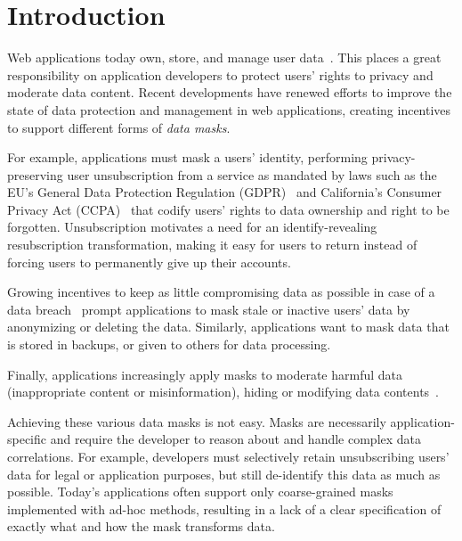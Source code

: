 \section{Introduction}
Web applications today own, store, and manage user data~\cite{nytimes:fb, npr:data}. 
This places a great responsibility on application developers to protect users' rights to privacy and
moderate data content.
%
Recent developments have renewed efforts to improve the state of data protection and management in
web applications, creating incentives to support different forms of \emph{data masks}. 

For example, applications must mask a users' identity, performing privacy-preserving user
unsubscription from a service as mandated by laws such as the EU's General Data Protection
Regulation (GDPR)~\cite{eu:gdpr} and California's Consumer Privacy Act (CCPA)~\cite{ca:privacy-act}
that codify users' rights to data ownership and right to be forgotten.  Unsubscription motivates a
need for an identify-revealing resubscription transformation, making it easy for users to return
instead of forcing users to permanently give up their accounts.

Growing incentives to keep as little compromising data as possible in case of a data
breach~\cite{breach:amazon,breach:twitter, breach:fb, breach:marriott, breach:quora} prompt
applications to mask stale or inactive users' data by anonymizing or deleting the data. Similarly,
applications want to mask data that is stored in backups, or given to others for data processing.

Finally, applications increasingly apply masks to moderate harmful data (\eg inappropriate content
or misinformation), hiding or modifying data contents~\cite{contentmod, sasb}.

Achieving these various data masks is not easy. Masks are necessarily application-specific and
require the developer to reason about and handle complex data correlations.  For example, developers
must selectively retain unsubscribing users' data for legal or application purposes, but still
de-identify this data as much as possible.  Today's applications often support only coarse-grained
masks implemented with ad-hoc methods, resulting in a lack of a clear specification of exactly what
and how the mask transforms data.


